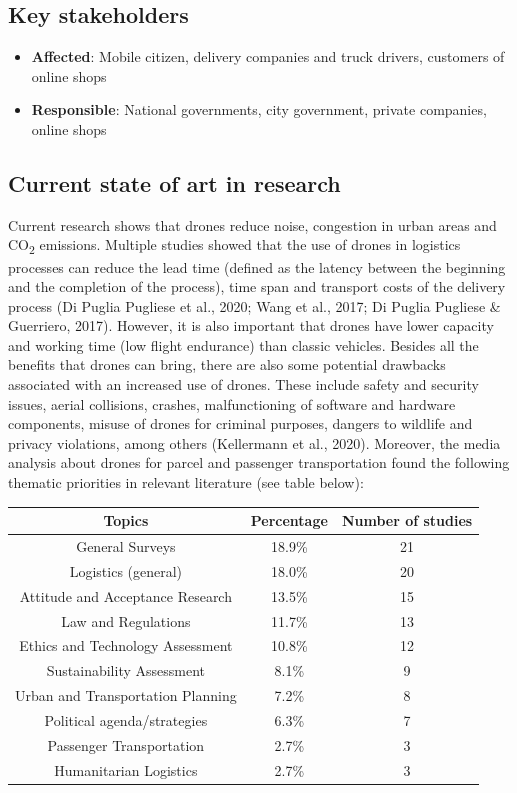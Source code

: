 \documentclass[
]{book}
\providecommand{\tightlist}{%
  \setlength{\itemsep}{0pt}\setlength{\parskip}{0pt}}
\begin{document}
\hypertarget{key-stakeholders-16}{%
\subsection*{Key stakeholders}\label{key-stakeholders-16}}

\begin{itemize}
\tightlist
\item
  \textbf{Affected}: Mobile citizen, delivery companies and truck drivers, customers of online shops
\item
  \textbf{Responsible}: National governments, city government, private companies, online shops
\end{itemize}

\hypertarget{current-state-of-art-in-research-16}{%
\subsection*{Current state of art in research}\label{current-state-of-art-in-research-16}}

Current research shows that drones reduce noise, congestion in urban areas and CO\textsubscript{2} emissions. Multiple studies showed that the use of drones in logistics processes can reduce the lead time (defined as the latency between the beginning and the completion of the process), time span and transport costs of the delivery process (Di Puglia Pugliese et al., 2020; Wang et al., 2017; Di Puglia Pugliese \& Guerriero, 2017). However, it is also important that drones have lower capacity and working time (low flight endurance) than classic vehicles.
Besides all the benefits that drones can bring, there are also some potential drawbacks associated with an increased use of drones. These include safety and security issues, aerial collisions, crashes, malfunctioning of software and hardware components, misuse of drones for criminal purposes, dangers to wildlife and privacy violations, among others (Kellermann et al., 2020).
Moreover, the media analysis about drones for parcel and passenger transportation found the following thematic priorities in relevant literature (see table below):

\begin{longtable}[]{@{}ccc@{}}
\toprule
Topics & Percentage & Number of studies\tabularnewline
\midrule
\endhead
General Surveys & 18.9\% & 21\tabularnewline
Logistics (general) & 18.0\% & 20\tabularnewline
Attitude and Acceptance Research & 13.5\% & 15\tabularnewline
Law and Regulations & 11.7\% & 13\tabularnewline
Ethics and Technology Assessment & 10.8\% & 12\tabularnewline
Sustainability Assessment & 8.1\% & 9\tabularnewline
Urban and Transportation Planning & 7.2\% & 8\tabularnewline
Political agenda/strategies & 6.3\% & 7\tabularnewline
Passenger Transportation & 2.7\% & 3\tabularnewline
Humanitarian Logistics & 2.7\% & 3\tabularnewline
\bottomrule
\end{longtable}
\end{document}
